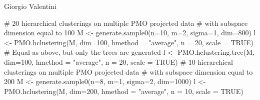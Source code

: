 \documentclass{article}
\begin{document}
\begin{Author}\relax
Giorgio Valentini 
\end{Author}
\begin{SeeAlso}\relax
{}
\end{SeeAlso}
\begin{Examples}
\begin{ExampleCode}
# 20 hierarchical clusterings on multiple PMO projected data 
# with subspace dimension equal to 100
M <- generate.sample0(n=10, m=2, sigma=1, dim=800)
l <- PMO.hclustering(M, dim=100, hmethod = "average", n = 20, scale = TRUE)
# Equal as above, but only the trees are generated
l <- PMO.hclustering.tree(M, dim=100, hmethod = "average", n = 20, scale = TRUE)
# 10 hierarchical clusterings on multiple PMO projected data 
# with subspace dimension equal to 200
M <- generate.sample0(n=8, m=1, sigma=2, dim=1000)
l <- PMO.hclustering(M, dim=200, hmethod = "average", n = 10, scale = TRUE)
\end{ExampleCode}
\end{Examples}
\end{document}
